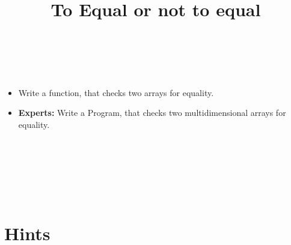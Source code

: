 


\title{To Equal or not to equal} %
\author{} %
\renewcommand{\difficulty}{Medium} %
\renewcommand{\requirements}{Arrays, loops} %
\renewcommand{\aims}{Iterate through arrays} %


 \maketitle
 \taskinfos

\ \\\ \\
\begin{itemize}
	\item Write a function, that checks two arrays for equality.
	\item \textbf{Experts:} Write a Program, that checks two multidimensional arrays for equality.
\end{itemize}	
 
 
\ \\\ \\\ \\\ \\\ \\
\section*{Hints}
 

